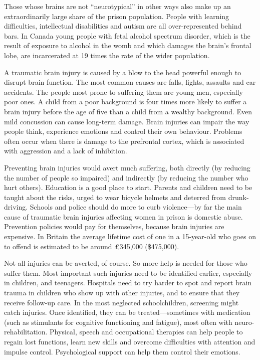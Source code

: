 \documentclass{article}
\begin{document}
Those whose brains are not ``neurotypical'' in other ways also make up an extraordinarily large share of the prison population. People with learning difficulties, intellectual disabilities and autism are all over-represented behind bars. In Canada young people with fetal alcohol spectrum disorder, which is the result of exposure to alcohol in the womb and which damages the brain's frontal lobe, are incarcerated at 19 times the rate of the wider population. 

A traumatic brain injury is caused by a blow to the head powerful enough to disrupt brain function. The most common causes are falls, fights, assaults and car accidents. The people most prone to suffering them are young men, especially poor ones. A child from a poor background is four times more likely to suffer a brain injury before the age of five than a child from a wealthy background. Even mild concussion can cause long-term damage. Brain injuries can impair the way people think, experience emotions and control their own behaviour. Problems often occur when there is damage to the prefrontal cortex, which is associated with aggression and a lack of inhibition. 

Preventing brain injuries would avert much suffering, both directly (by reducing the number of people so impaired) and indirectly (by reducing the number who hurt others). Education is a good place to start. Parents and children need to be taught about the risks, urged to wear bicycle helmets and deterred from drunk-driving. Schools and police should do more to curb violence---by far the main cause of traumatic brain injuries affecting women in prison is domestic abuse. Prevention policies would pay for themselves, because brain injuries are expensive. In Britain the average lifetime cost of one in a 15-year-old who goes on to offend is estimated to be around £345,000 (\$475,000). 

Not all injuries can be averted, of course. So more help is needed for those who suffer them. Most important such injuries need to be identified earlier, especially in children, and teenagers. Hospitals need to try harder to spot and report brain trauma in children who show up with other injuries, and to ensure that they receive follow-up care. In the most neglected schoolchildren, screening might catch injuries. Once identified, they can be treated---sometimes with medication (such as stimulants for cognitive functioning and fatigue), most often with neuro-rehabilitation. Physical, speech and occupational therapies can help people to regain lost functions, learn new skills and overcome difficulties with attention and impulse control. Psychological support can help them control their emotions. 
\end{document}
